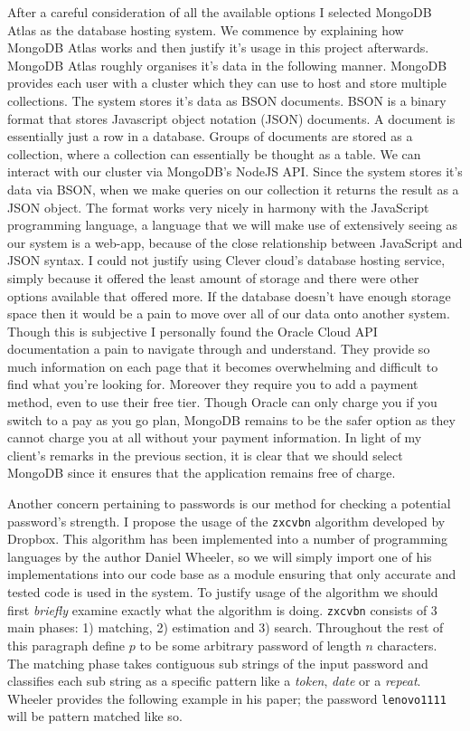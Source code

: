 After a careful consideration of all the available options 
I selected MongoDB Atlas as the database hosting system. We 
commence by explaining how MongoDB Atlas works and then 
justify it's usage in this project afterwards. MongoDB Atlas
roughly organises it's data in the following manner. MongoDB
provides each user with a cluster which they can use to host
and store multiple collections. The system stores it's data
as BSON documents. BSON is a binary format that stores
Javascript object notation (JSON) documents. A document is 
essentially just a row in a database. Groups of documents 
are stored as a collection, where a collection can 
essentially be thought as a table. We can interact with our
cluster via MongoDB's NodeJS API. Since the system stores
it's data via BSON, when we make queries on our collection it
returns the result as a JSON object. The format works very 
nicely in harmony with the JavaScript programming language, 
a language that we will make use of extensively seeing as our
system is a web-app, because of the close relationship
between JavaScript and JSON syntax. I could not justify using 
Clever cloud's database hosting service, simply because it 
offered the least amount of storage and there were other 
options available that offered more. If the database doesn't 
have enough storage space then it would be a pain to move over
all of our data onto another system. Though this is subjective
I personally found the Oracle Cloud API documentation a pain 
to navigate through and understand. They provide so much 
information on each page that it becomes overwhelming and 
difficult to find what you're looking for. Moreover they 
require you to add a payment method, even to use their free 
tier. Though Oracle can only charge you if you switch to a 
pay as you go plan, MongoDB remains to be the safer option
as they cannot charge you at all without your payment 
information. In light of my client's remarks in the previous
section, it is clear that we should select MongoDB since 
it ensures that the application remains free of charge.
\\ \vspace{0.2cm}

Another concern pertaining to passwords is our method for 
checking a potential password's strength. I propose the usage
of the \texttt{zxcvbn} algorithm \cite{pass} developed by
Dropbox. This algorithm has been implemented into a number of
programming languages by the author Daniel Wheeler, so we will
simply import one of his implementations into our code base as
a module ensuring that only accurate and tested code is used 
in the system. To justify usage of the algorithm we should
first \textit{briefly} examine exactly what the algorithm is
doing. \texttt{zxcvbn} consists of 3 main phases: 1) matching,
2) estimation and 3) search. Throughout the rest of this
paragraph define $p$ to be some arbitrary password of length
$n$ characters. The matching phase takes contiguous
sub strings of the input password and classifies
each sub string as a specific pattern like a \textit{token},
\textit{date} or a \textit{repeat}. Wheeler provides the
following example in his paper; the password
\texttt{lenovo1111} will be pattern matched like so.

